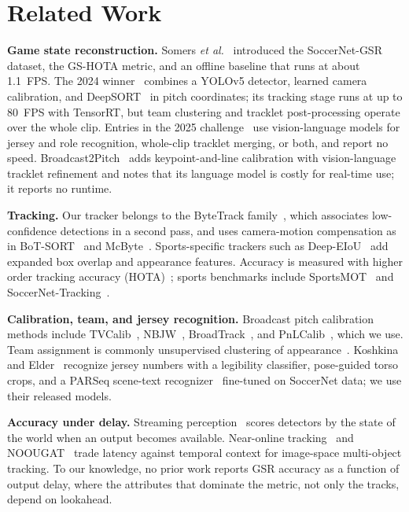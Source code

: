 \documentclass[conference]{IEEEtran}
\begin{document}
\section{Related Work}
\textbf{Game state reconstruction.} Somers \emph{et al.}~\cite{somers2024gsr} introduced the SoccerNet-GSR dataset, the GS-HOTA metric, and an offline baseline that runs at about 1.1~FPS. The 2024 winner~\cite{golovkin2025minimap} combines a YOLOv5 detector, learned camera calibration, and DeepSORT~\cite{wojke2017deepsort} in pitch coordinates; its tracking stage runs at up to 80~FPS with TensorRT, but team clustering and tracklet post-processing operate over the whole clip. Entries in the 2025 challenge~\cite{soccernet2025results} use vision-language models for jersey and role recognition, whole-clip tracklet merging, or both, and report no speed. Broadcast2Pitch~\cite{oo2026broadcast2pitch} adds keypoint-and-line calibration with vision-language tracklet refinement and notes that its language model is costly for real-time use; it reports no runtime.

\textbf{Tracking.} Our tracker belongs to the ByteTrack family~\cite{zhang2022bytetrack}, which associates low-confidence detections in a second pass, and uses camera-motion compensation as in BoT-SORT~\cite{aharon2022botsort} and McByte~\cite{stanczyk2025mcbyte}. Sports-specific trackers such as Deep-EIoU~\cite{huang2024deepeiou} add expanded box overlap and appearance features. Accuracy is measured with higher order tracking accuracy (HOTA)~\cite{luiten2021hota}; sports benchmarks include SportsMOT~\cite{cui2023sportsmot} and SoccerNet-Tracking~\cite{cioppa2022soccernettracking}.

\textbf{Calibration, team, and jersey recognition.} Broadcast pitch calibration methods include TVCalib~\cite{theiner2023tvcalib}, NBJW~\cite{gutierrez2024nbjw}, BroadTrack~\cite{magera2025broadtrack}, and PnLCalib~\cite{gutierrez2024pnlcalib}, which we use. Team assignment is commonly unsupervised clustering of appearance~\cite{koshkina2021contrastive}. Koshkina and Elder~\cite{koshkina2024jersey} recognize jersey numbers with a legibility classifier, pose-guided torso crops, and a PARSeq scene-text recognizer~\cite{bautista2022parseq} fine-tuned on SoccerNet data; we use their released models.

\textbf{Accuracy under delay.} Streaming perception~\cite{li2020streaming} scores detectors by the state of the world when an output becomes available. Near-online tracking~\cite{choi2015nomt} and NOOUGAT~\cite{missaoui2026noougat} trade latency against temporal context for image-space multi-object tracking. To our knowledge, no prior work reports GSR accuracy as a function of output delay, where the attributes that dominate the metric, not only the tracks, depend on lookahead.
\end{document}
